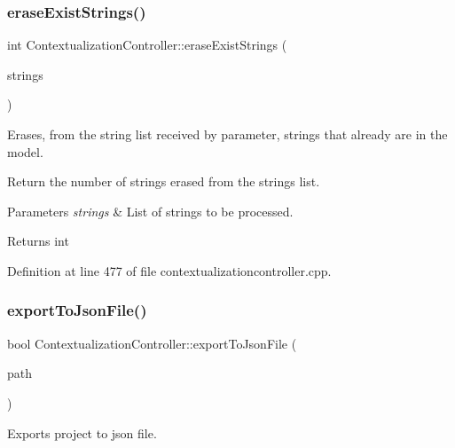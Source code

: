\subsubsection{\texorpdfstring{erase\+Exist\+Strings()}{eraseExistStrings()}}
{\footnotesize\ttfamily int Contextualization\+Controller\+::erase\+Exist\+Strings (\begin{DoxyParamCaption}\item[{Q\+List$<$ \mbox{\hyperlink{classFirmwareString}{Firmware\+String}} $\ast$$>$ $\ast$}]{strings }\end{DoxyParamCaption})\hspace{0.3cm}{\ttfamily [protected]}}



Erases, from the string list received by parameter, strings that already are in the model. 

Return the number of strings erased from the strings list. 
\begin{DoxyParams}{Parameters}
{\em strings} & List of strings to be processed. \\
\hline
\end{DoxyParams}
\begin{DoxyReturn}{Returns}
int 
\end{DoxyReturn}


Definition at line 477 of file contextualizationcontroller.\+cpp.

\mbox{\label{classContextualizationController_a26fc3969db0e2217dc6994f819c78572}} 
\subsubsection{\texorpdfstring{export\+To\+Json\+File()}{exportToJsonFile()}}
{\footnotesize\ttfamily bool Contextualization\+Controller\+::export\+To\+Json\+File (\begin{DoxyParamCaption}\item[{const Q\+String \&}]{path }\end{DoxyParamCaption})\hspace{0.3cm}{\ttfamily [protected]}}



Exports project to json file. 

